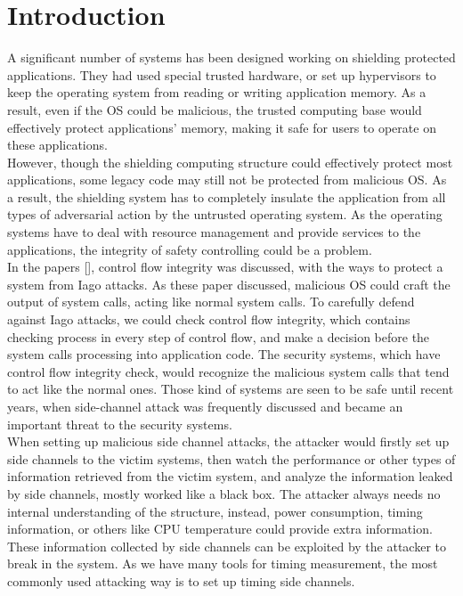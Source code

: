 \documentclass{sig-alternate}
\begin{document}


\section{Introduction}
A significant number of systems has been designed working on shielding protected applications. They had used special trusted hardware, or set up hypervisors to keep the operating system from reading or writing application memory. As a result, even if the OS could be malicious, the trusted computing base would effectively protect applications' memory, making it safe for users to operate on these applications.
\\
\indent
However, though the shielding computing structure could effectively protect most applications, some legacy code may still not be protected from malicious OS. As a result, the shielding system has to completely insulate the application from all types of adversarial action by the untrusted operating system. As the operating systems have to deal with resource management and provide services to the applications, the integrity of safety controlling could be a problem.
\\
\indent
In the papers [], control flow integrity was discussed, with the ways to protect a system from Iago attacks. As these paper discussed, malicious OS could craft the output of system calls, acting like normal system calls. To carefully defend against Iago attacks, we could check control flow integrity, which contains checking process in every step of control flow, and make a decision before the system calls processing into application code. The security systems, which have control flow integrity check, would recognize the malicious system calls that tend to act like the normal ones. Those kind of systems are seen to be safe until recent years, when side-channel attack was frequently discussed and became an important threat to the security systems.
\\
\indent
When setting up malicious side channel attacks, the attacker would firstly set up side channels to the victim systems, then watch the performance or other types of information retrieved from the victim system, and analyze the information leaked by side channels, mostly worked like a black box. The attacker always needs no internal understanding of the structure, instead, power consumption, timing information, or others like CPU temperature could provide extra information. These information collected by side channels can be exploited by the attacker to break in the system. As we have many tools for timing measurement, the most commonly used attacking way is to set up timing side channels.
\end{document}
